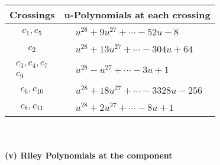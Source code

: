 \documentclass[1p]{elsarticle_modified}
\theoremstyle{definition}
\begin{document}
\begin{tabular}{m{50pt}|m{274pt}}
Crossings & \hspace{64pt}u-Polynomials at each crossing \\
\hline $$\begin{aligned}c_{1},c_{5}\end{aligned}$$&$\begin{aligned}
&u^{28}+9 u^{27}+\cdots-52 u-8
\end{aligned}$\\
\hline $$\begin{aligned}c_{2}\end{aligned}$$&$\begin{aligned}
&u^{28}+13 u^{27}+\cdots-304 u+64
\end{aligned}$\\
\hline $$\begin{aligned}c_{3},c_{4},c_{7}\\c_{9}\end{aligned}$$&$\begin{aligned}
&u^{28}- u^{27}+\cdots-3 u+1
\end{aligned}$\\
\hline $$\begin{aligned}c_{6},c_{10}\end{aligned}$$&$\begin{aligned}
&u^{28}+18 u^{27}+\cdots-3328 u-256
\end{aligned}$\\
\hline $$\begin{aligned}c_{8},c_{11}\end{aligned}$$&$\begin{aligned}
&u^{28}+2 u^{27}+\cdots-8 u+1
\end{aligned}$\\
\hline
\end{tabular}\\~\\
\newpage\renewcommand{\arraystretch}{1}
\flushleft \textbf{(v) Riley Polynomials at the component}\newline \\
\end{document}

